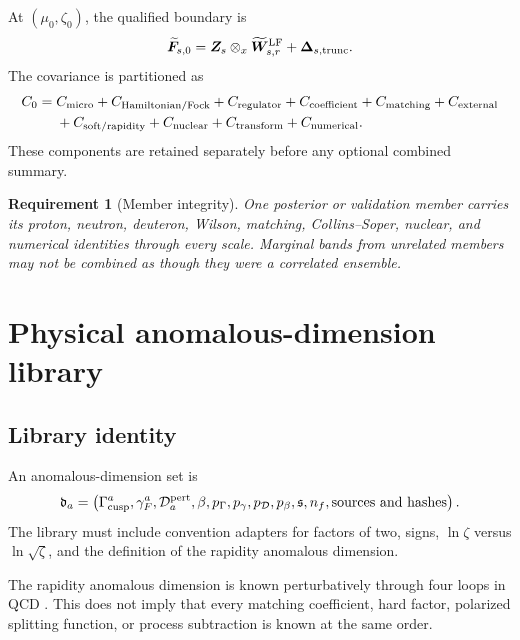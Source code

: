 \documentclass[11pt]{article}
\newtheorem{requirement}[definition]{Requirement}
\newcommand{\LF}{\mathrm{LF}}
\newcommand{\otimesx}{\mathbin{\otimes_x}}
\begin{document}
At \((\mu_0,\zeta_0)\), the qualified boundary is
\begin{equation}
 \widetilde{\bm F}_{s,0}
 =
 \bm Z_s
 \otimesx
 \widetilde{\bm W}^{\LF}_{s,r}
 +
 \bm\Delta_{s,\rm trunc}.
 \label{eq:reference-boundary}
\end{equation}
The covariance is partitioned as
\begin{align}
 C_{0}={}&
 C_{\rm micro}
 +C_{\rm Hamiltonian/Fock}
 +C_{\rm regulator}
 +C_{\rm coefficient}
 +C_{\rm matching}
 +C_{\rm external}
 \notag\\
 &+C_{\rm soft/rapidity}
 +C_{\rm nuclear}
 +C_{\rm transform}
 +C_{\rm numerical}.
 \label{eq:boundary-covariance}
\end{align}
These components are retained separately before any optional combined summary.

\begin{requirement}[Member integrity]
One posterior or validation member carries its proton, neutron, deuteron, Wilson, matching, Collins--Soper, nuclear, and numerical identities through every scale.  Marginal bands from unrelated members may not be combined as though they were a correlated ensemble.
\end{requirement}

\section{Physical anomalous-dimension library}
\label{sec:anomalous-dimensions}

\subsection{Library identity}

An anomalous-dimension set is
\begin{equation}
 \mathfrak\Gamma_a=
 \left(
 \Gamma_{\rm cusp}^a,
 \gamma_F^a,
 \mathcal D_a^{\rm pert},
 \beta,
 p_\Gamma,p_\gamma,p_{\mathcal D},p_\beta,
 \mathfrak s,
 n_f,
 \text{sources and hashes}
 \right).
 \label{eq:ad-library}
\end{equation}
The library must include convention adapters for factors of two, signs, \(\ln\zeta\) versus \(\ln\sqrt\zeta\), and the definition of the rapidity anomalous dimension.

The rapidity anomalous dimension is known perturbatively through four loops in QCD \cite{MoultZhuZhu2022,DuhrMistlbergerVita2022}.  This does not imply that every matching coefficient, hard factor, polarized splitting function, or process subtraction is known at the same order.
\end{document}
